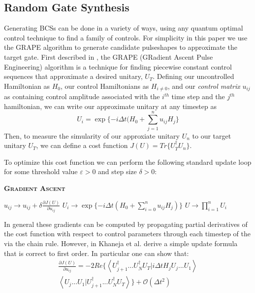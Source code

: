\documentclass[aps,nofootinbib,pra,notitlepage,twocolumn]{revtex4-1}
\newcommand{\braket}[2]{\left\langle #1 | #2 \right\rangle}
\begin{document}
\subsection{Random Gate Synthesis}
Generating BCSs can be done in a variety of ways, using any quantum optimal control technique \cite{Caneva2011, Machnes2018} to find a family of controls. For simplicity in this paper we use the GRAPE algorithm to generate candidate pulseshapes to approximate the target gate. First described in \cite{Khaneja2005}, the GRAPE (GRadient Ascent Pulse Engineering) algorithm is a technique for finding piecewise constant control sequences that approximate a desired unitary, $U_T$. Defining our uncontrolled Hamiltonian as $H_0$, our control Hamiltonians as $H_{i\neq 0}$, and our \textit{control matrix} $u_{ij}$ as containing control amplitude associated with the $i^{th}$ time step and the $j^{th}$ hamiltonian, we can write our approximate unitary at any timestep as
\begin{equation}\label{eq:3}
  U_i = \exp\{-i\Delta t(H_0 + \sum_{j=1}^{n}u_{ij}H_{j}\}
\end{equation}
Then, to measure the simularity of our approxiate unitary $U_n$ to our target unitary $U_T$, we can define a cost function $J(U) = Tr\{U_T^{\dagger}U_n\}$.

To optimize this cost function we can perform the following standard update loop for some threshold value $\varepsilon > 0$ and step size $\delta > 0$:
\begin{algorithm}[H]
  \caption{\textsc{\textbf{Gradient Ascent}}}
  \begin{algorithmic}
    \State $u_{ij} \rightarrow u_{ij} + \delta\frac{\partial J(U)}{\partial u_{ij}}$
    \State $U_i \rightarrow \exp\{-i\Delta t(H_0 + \sum_{i=0}^{n}u_{ij}H_j)\}$
    \EndFor
    \State $U \rightarrow \prod_{i=1}^nU_i$
    \EndWhile
  \end{algorithmic}
\end{algorithm}

In general these gradients can be computed by propagating partial derivatives of the cost function with respect to control parameters through each timestep of the  via the chain rule. However, in \cite{Khaneja2005} Khaneja et al. derive a simple update formula that is correct to first order. In particular one can show that:
\begin{equation}\label{eq:update}
  \begin{split}
\frac{\partial J(U)}{\partial u_{ij}} = -2Re\{\braket{{U_{j+1}^{\dagger}...U_N^{\dagger} U_T}}{i\Delta tH_jU_j...U_1}\\
\braket{U_j...U_1}{U_{j+1}^{\dagger}...U_N^{\dagger} U_T}\} +  \mathcal{O}(\Delta t^2)
  \end{split}
\end{equation}
\end{document}
